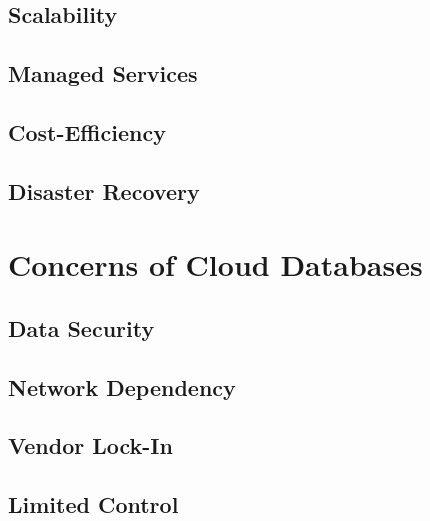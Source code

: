 \documentclass[12pt, a4paper]{article}
\begin{document}
    \subsection{Scalability}
    \subsection{Managed Services}
    \subsection{Cost-Efficiency}
    \subsection{Disaster Recovery}
\clearpage

\section{Concerns of Cloud Databases}
    \subsection{Data Security}
    \subsection{Network Dependency}
    \subsection{Vendor Lock-In}
    \subsection{Limited Control}
\clearpage

\section*{}
\clearpage


\end{document}
